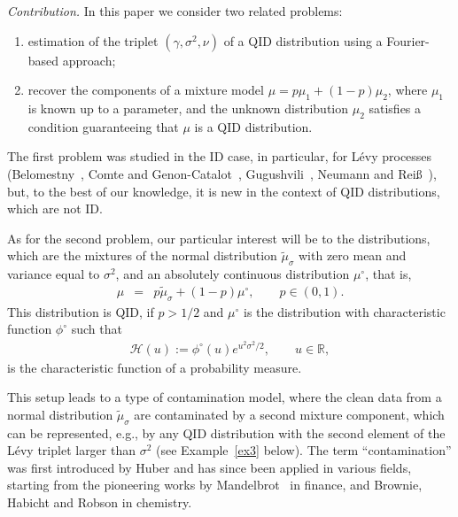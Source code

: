 \documentclass[a4paper,11pt]{article}
\theoremstyle{definition}
\newcommand{\R}{{\mathbb{R}}}
\newcommand{\1}{\mathbb{I}}
\def\R{\mathbb{R}}
\theoremstyle{remark}
\begin{document}
\textit{Contribution.} 
In this paper we consider two related problems: 
\begin{enumerate}
\item estimation of the  triplet \((\gamma, \sigma^2, \nu)\) of a QID distribution using a Fourier-based approach;
\item recover the components of a mixture model \(\mu = p \mu_1 + (1-p)\mu_2\), where \(\mu_1\) is known up to a parameter, and the unknown distribution \(\mu_2\) satisfies a condition guaranteeing that \(\mu\) is a QID distribution.
\end{enumerate}
The first problem was studied in the ID case, in particular, for L{\'e}vy processes (Belomestny~\cite{DB2010}, Comte and Genon-Catalot~\cite{CGC2010},
 Gugushvili~\cite{Gugu}, Neumann and Rei{\ss}~\cite{NR2009}), but, to the best of our knowledge, it is  new in the context of QID distributions, which are not ID.
 
As for the second problem,  our particular interest will be to the distributions, which are the mixtures of the normal distribution \(\tilde\mu_{\sigma}\) with zero mean and variance equal to \(\sigma^2\), and an absolutely continuous distribution \(\mu^\circ\), that is, 
\begin{eqnarray}\label{model1}
\mu &=&p  \tilde\mu_{\sigma} + (1-p) \mu^\circ, \qquad p \in (0,1).
\end{eqnarray}
This distribution is QID, if \(p>1/2\) and \(\mu^\circ\) is the distribution with  characteristic function \(\phi^\circ\) such that 
\begin{eqnarray}
\label{H}
\mathcal{H}(u):=\phi^\circ(u) e^{u^2 \sigma^2 /2}, \qquad u \in \R,
\end{eqnarray} is the characteristic function of a probability measure.

%
This setup leads to a type of contamination model, where the clean data from a normal distribution $\tilde\mu_{\sigma}$ are contaminated by a second mixture component, which can be represented, e.g., by any QID distribution with the second element of the L{\'e}vy triplet larger than \(\sigma^2\) (see Example~\ref{ex3} below). The term ``contamination'' was first introduced by Huber \cite{Huber} and has since been applied in various fields, starting from the pioneering works by Mandelbrot~\cite{Mandelbrot} in finance, and Brownie, Habicht and Robson \cite{Brownie} in chemistry.
\end{document}
